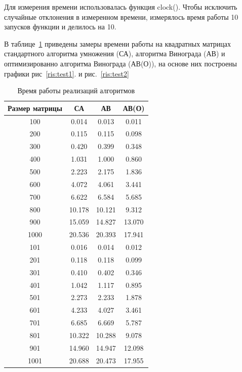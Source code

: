 \documentclass[a4paper,12pt]{article}
\begin{document}
	    Для измерения времени использовалась функция clock(). Чтобы исключить случайные отклонения в измеренном времени, измерялось время работы 10 запусков функции и делилось на 10.
	    
	    В таблице~\ref{tabular:test_time} приведены замеры времени работы на квадратных матрицах стандартного алгоритма умножения (СА), алгоритма Винограда (АВ) и оптимизированно алгоритма Винограда (АВ(О)), на основе них построены графики рис~\ref{ris:test1}. и рис.~\ref{ris:test2}
	\begin{table}[H]
	\caption{\label{tabular:test_time} Время работы реализаций алгоритмов}
	\begin{center}	    
	\begin{tabular}{|c|c|c|c|}        			
        				\hline
        				Размер матрицы & СА & АВ      & АВ(О)\\
        				\hline
        				100      &0.014  &0.013  &0.011\\
        				200      &0.115  &0.115  &0.098\\
        				300      &0.420  &0.399  &0.348\\
        				400      &1.031  &1.000  &0.860\\ 
        				500      &2.223  &2.175  &1.836\\
        				600      &4.072  &4.061  &3.441\\ 
        				700      &6.622  &6.584  &5.685\\
        				800      &10.178 &10.121 &9.312\\
        				900      &15.059 &14.827 &13.070\\
        			   1000      &20.536 &20.393 &17.941\\        		        				101      &0.016  &0.014  &0.012\\
        				201      &0.118  &0.118  &0.099\\
        				301      &0.410  &0.402  &0.346\\
        				401      &1.042  &1.117  &0.895\\ 
        				501      &2.273  &2.233  &1.878\\
        				601      &4.233  &4.027  &3.461\\ 
        				701      &6.685  &6.669  &5.787\\
        				801      &10.322 &10.288 &9.078\\
        				901      &14.960 &14.947 &12.098\\
        			   1001      &20.688 &20.473 &17.955\\		
        				\hline
	\end{tabular}
	\end{center}
	\end{table}
\end{document}
